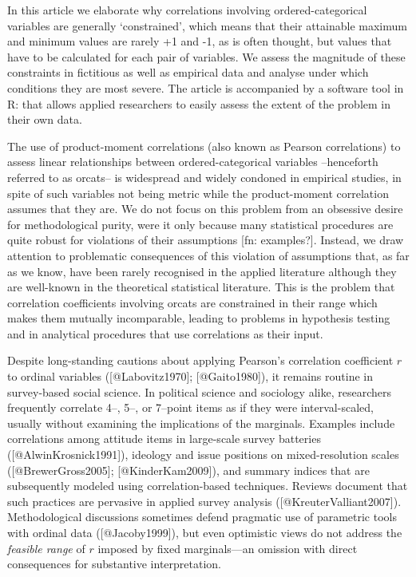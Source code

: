 \documentclass[
  12pt,
]{article}
\theoremstyle{plain}
\theoremstyle{definition}
\theoremstyle{remark}
\begin{document}
In this article we elaborate why correlations involving
ordered-categorical variables are generally `constrained', which means
that their attainable maximum and minimum values are rarely +1 and -1,
as is often thought, but values that have to be calculated for each pair
of variables. We assess the magnitude of these constraints in fictitious
as well as empirical data and analyse under which conditions they are
most severe. The article is accompanied by a software tool in R: that
allows applied researchers to easily assess the extent of the problem in
their own data.

The use of product-moment correlations (also known as Pearson
correlations) to assess linear relationships between ordered-categorical
variables --henceforth referred to as orcats-- is widespread and widely
condoned in empirical studies, in spite of such variables not being
metric while the product-moment correlation assumes that they are. We do
not focus on this problem from an obsessive desire for methodological
purity, were it only because many statistical procedures are quite
robust for violations of their assumptions {[}fn: examples?{]}. Instead,
we draw attention to problematic consequences of this violation of
assumptions that, as far as we know, have been rarely recognised in the
applied literature although they are well-known in the theoretical
statistical literature. This is the problem that correlation
coefficients involving orcats are constrained in their range which makes
them mutually incomparable, leading to problems in hypothesis testing
and in analytical procedures that use correlations as their input.

Despite long-standing cautions about applying Pearson’s correlation coefficient \(r\) to ordinal variables ([@Labovitz1970]; [@Gaito1980]), it remains routine in survey-based social science. In political science and sociology alike, researchers frequently correlate 4–, 5–, or 7–point items as if they were interval-scaled, usually without examining the implications of the marginals. Examples include correlations among attitude items in large-scale survey batteries ([@AlwinKrosnick1991]), ideology and issue positions on mixed-resolution scales ([@BrewerGross2005]; [@KinderKam2009]), and summary indices that are subsequently modeled using correlation-based techniques. Reviews document that such practices are pervasive in applied survey analysis ([@KreuterValliant2007]). Methodological discussions sometimes defend pragmatic use of parametric tools with ordinal data ([@Jacoby1999]), but even optimistic views do not address the \emph{feasible range} of \(r\) imposed by fixed marginals—an omission with direct consequences for substantive interpretation.
\end{document}
